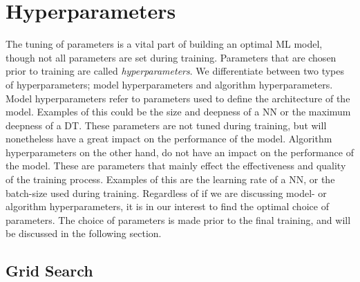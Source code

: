 \section{Hyperparameters}
The tuning of parameters is a vital part of building an optimal \ac{ML}
model, though not all parameters are set during training. Parameters 
that are chosen prior to training are called \emph{hyperparameters}. We differentiate
between two types of hyperparameters; model hyperparameters and algorithm 
hyperparameters. Model hyperparameters refer to parameters used to define the 
architecture of the model. Examples of this could be the size and deepness of 
a \ac{NN} or the maximum deepness of a \ac{DT}. These parameters are not tuned
during training, but will nonetheless have a great impact on the performance 
of the model. Algorithm hyperparameters on the other hand, do not have an impact 
on the performance of the model. These are parameters that mainly effect the 
effectiveness and quality of the training process. Examples of this are the 
learning rate of a \ac{NN}, or the batch-size used during training. Regardless 
of if we are discussing model- or algorithm hyperparameters, it is in our interest
to find the optimal choice of parameters. The choice of parameters is made 
prior to the final training, and will be discussed in the following section.


\subsection{Grid Search}
